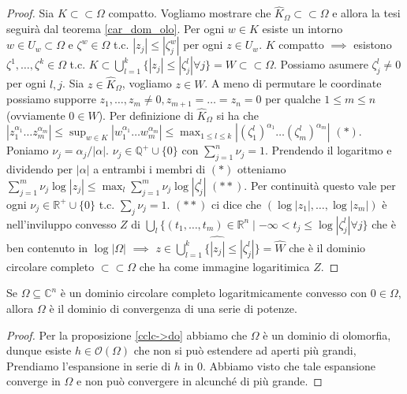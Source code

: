 \begin{proof}
  Sia $K \subset\subset \Omega$ compatto. Vogliamo mostrare che $\hat{K}_\Omega \subset\subset \Omega$ e allora la tesi seguirà dal teorema \ref{car_dom_olo}. Per ogni $w \in K$ esiste un intorno $w \in U_w \subset \Omega$ e $\zeta^w \in \Omega$ t.c. $|z_j| \le |\zeta_j^w|$ per ogni $z \in U_w$.
  $K$ compatto $\implies$ esistono $\zeta^1, \dots, \zeta^k \in \Omega$ t.c. $\displaystyle K \subset \bigcup_{l=1}^k \{|z_j| \le |\zeta_j^l| \forall j\}=W \subset\subset \Omega$. Possiamo asumere $\zeta_j^l \not=0$ per ogni $l,j$. Sia $z \in \hat{K}_\Omega$, vogliamo $z \in W$.
  A meno di permutare le coordinate possiamo supporre $z_1, \dots, z_m \not=0, z_{m+1}=\dots=z_n=0$ per qualche $1 \le m \le n$ (ovviamente $0 \in W$).
  Per definizione di $\hat{K}_\Omega$ si ha che $\displaystyle |z_1^{\alpha_1}\dots z_m^{\alpha_m}| \le \sup_{w \in K} |w_1^{\alpha_1}\dots w_m^{\alpha_m}| \le \max_{1 \le l \le k} |(\zeta_1^l)^{\alpha_1}\dots(\zeta_m^l)^{\alpha_m}|$ $(*)$.
  Poniamo $\nu_j=\alpha_j/|\alpha|$. $\nu_j \in \mathbb{Q}^+\cup\{0\}$ con $\displaystyle \sum_{j=1}^n \nu_j=1$. Prendendo il logaritmo e dividendo per $|\alpha|$ a entrambi i membri di $(*)$ otteniamo $\displaystyle \sum_{j=1}^m \nu_j\log{|z_j|} \le \max_l \sum_{j=1}^m \nu_j\log{|\zeta_j^l|}$ $(**)$.
  Per continuità questo vale per ogni $\nu_j \in \mathbb{R}^+\cup\{0\}$ t.c. $\displaystyle \sum_j \nu_j=1$.
  $(**)$ ci dice che $(\log{|z_1|},\dots,\log{|z_m|})$ è nell'inviluppo convesso $Z$ di $\displaystyle \bigcup_l \{(t_1,\dots,t_m) \in \mathbb{R}^n \mid -\infty<t_j \le \log{|\zeta_j^l|}\forall j\}$ che è ben contenuto in $\log{|\Omega|}$ $\implies$ $\displaystyle z \in \widehat{\bigcup_{l=1}^k \{|z_j| \le |\zeta_j^l|\}}=\hat{W}$ che è il dominio circolare completo $\subset\subset \Omega$ che ha come immagine logaritimica $Z$.
\end{proof}

\begin{cor}
  Se $\Omega \subseteq \mathbb{C}^n$ è un dominio circolare completo logaritmicamente convesso con $0 \in \Omega$, allora $\Omega$ è il dominio di convergenza di una serie di potenze.
\end{cor}

\begin{proof}
  Per la proposizione \ref{cclc->do} abbiamo che $\Omega$ è un dominio di olomorfia, dunque esiste $h \in \mathcal{O}(\Omega)$ che non si può estendere ad aperti più grandi, Prendiamo l'espansione in serie di $h$ in $0$. Abbiamo visto che tale espansione converge in $\Omega$ e non può convergere in alcunché di più grande.
\end{proof}
